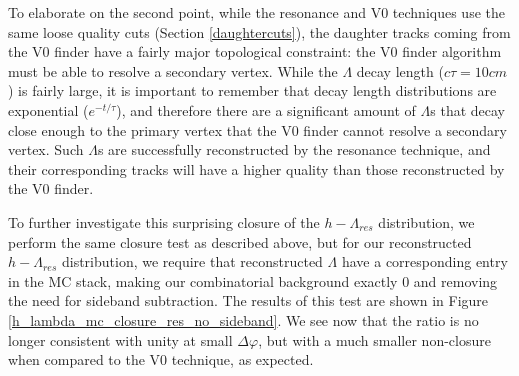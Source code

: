 \documentclass[ALICE,manyauthors]{ALICE_analysis_notes}
\begin{document}
To elaborate on the second point, while the resonance and V0 techniques use the same loose quality cuts (Section \ref{daughtercuts}), the daughter tracks coming from the V0 finder have a fairly major topological constraint: the V0 finder algorithm must be able to resolve a secondary vertex. While the $\Lambda$ decay length ($c\tau = 10 cm$) is fairly large, it is important to remember that decay length distributions are exponential ($e^{-t/\tau}$), and therefore there are a significant amount of $\Lambda$s that decay close enough to the primary vertex that the V0 finder cannot resolve a secondary vertex. Such $\Lambda$s are successfully reconstructed by the resonance technique, and their corresponding tracks will have a higher quality than those reconstructed by the V0 finder.

To further investigate this surprising closure of the $h-\Lambda_{res}$ distribution, we perform the same closure test as described above, but for our reconstructed $h-\Lambda_{res}$ distribution, we require that reconstructed $\Lambda$ have a corresponding entry in the MC stack, making our combinatorial background exactly 0 and removing the need for sideband subtraction. The results of this test are shown in Figure \ref{h_lambda_mc_closure_res_no_sideband}. We see now that the ratio is no longer consistent with unity at small $\Delta\varphi$, but with a much smaller non-closure when compared to the V0 technique, as expected.
\end{document}
